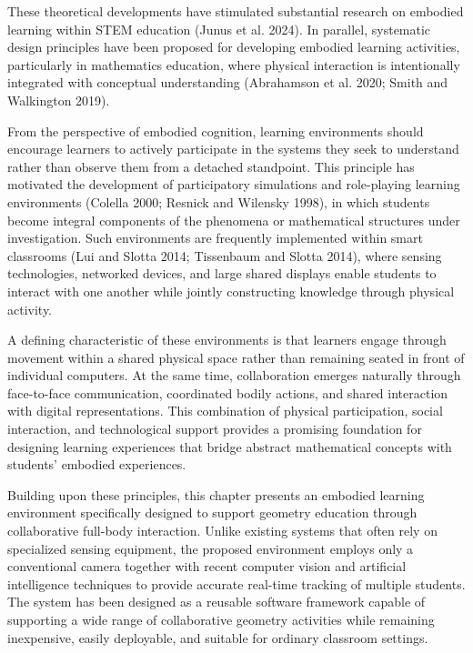 These theoretical developments have stimulated substantial research on
embodied learning within STEM education (Junus et al. 2024). In
parallel, systematic design principles have been proposed for developing
embodied learning activities, particularly in mathematics education,
where physical interaction is intentionally integrated with conceptual
understanding (Abrahamson et al. 2020; Smith and Walkington 2019).

From the perspective of embodied cognition, learning environments should
encourage learners to actively participate in the systems they seek to
understand rather than observe them from a detached standpoint. This
principle has motivated the development of participatory simulations and
role-playing learning environments (Colella 2000; Resnick and Wilensky
1998), in which students become integral components of the phenomena or
mathematical structures under investigation. Such environments are
frequently implemented within smart classrooms (Lui and Slotta 2014;
Tissenbaum and Slotta 2014), where sensing technologies, networked
devices, and large shared displays enable students to interact with one
another while jointly constructing knowledge through physical activity.

A defining characteristic of these environments is that learners engage
through movement within a shared physical space rather than remaining
seated in front of individual computers. At the same time, collaboration
emerges naturally through face-to-face communication, coordinated bodily
actions, and shared interaction with digital representations. This
combination of physical participation, social interaction, and
technological support provides a promising foundation for designing
learning experiences that bridge abstract mathematical concepts with
students' embodied experiences.

Building upon these principles, this chapter presents an embodied
learning environment specifically designed to support geometry education
through collaborative full-body interaction. Unlike existing systems
that often rely on specialized sensing equipment, the proposed
environment employs only a conventional camera together with recent
computer vision and artificial intelligence techniques to provide
accurate real-time tracking of multiple students. The system has been
designed as a reusable software framework capable of supporting a wide
range of collaborative geometry activities while remaining inexpensive,
easily deployable, and suitable for ordinary classroom settings.

